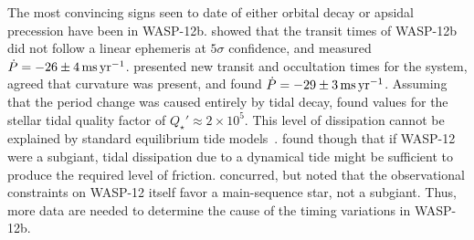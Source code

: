 \documentclass[12pt,twocolumn,tighten]{aastex62}
\begin{document}
The most convincing signs seen to date of either orbital decay or apsidal
precession have been in WASP-12b.
\citet{maciejewski_departure_2016} showed that the transit times of
WASP-12b did not follow a linear ephemeris at $5\sigma$ confidence,
and measured $\dot{P} = -26 \pm 4\,{\rm ms}\,{\rm yr}^{-1}$.
\citet{patra_2017} presented new transit and occultation times for
the system, agreed that curvature was present, and found
$\dot{P} = -29 \pm 3\,{\rm ms}\,{\rm yr}^{-1}$.
Assuming that the period change was caused entirely by tidal decay,
\citet{patra_2017} found values for the stellar tidal quality factor
of $Q_\star' \approx 2\times10^5$.  This level of dissipation cannot be
explained by standard equilibrium tide
models~\citep{penev_tidal_2011,ogilvie_tidal_2014}.
\citet{weinberg_tidal_2017} found though that if WASP-12 were a
subgiant, tidal dissipation due to a dynamical tide might be
sufficient to produce the required level of friction.
\cite{bailey_understanding_2019} concurred, but noted that the
observational constraints on WASP-12 itself favor a main-sequence
star, not a subgiant.  Thus, more data are needed to determine the
cause of the timing variations in WASP-12b.

\end{document}
